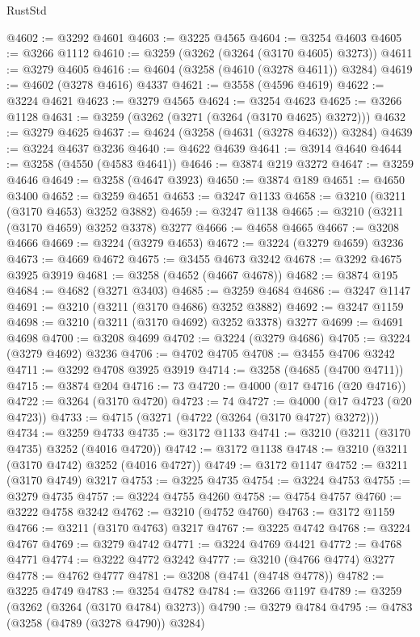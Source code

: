 \begin{lexlean}{RustStd}
\begin{coremodule}
@4602 := @3292 @4601
@4603 := @3225 @4565
@4604 := @3254 @4603
@4605 := @3266 @1112
@4610 := @3259 (@3262 (@3264 (@3170 @4605) @3273))
@4611 := @3279 @4605
@4616 := @4604 (@3258 (@4610 (@3278 @4611)) @3284)
@4619 := @4602 (@3278 @4616) @4337
@4621 := @3558 (@4596 @4619)
@4622 := @3224 @4621
@4623 := @3279 @4565
@4624 := @3254 @4623
@4625 := @3266 @1128
@4631 := @3259 (@3262 (@3271 (@3264 (@3170 @4625) @3272)))
@4632 := @3279 @4625
@4637 := @4624 (@3258 (@4631 (@3278 @4632)) @3284)
@4639 := @3224 @4637 @3236
@4640 := @4622 @4639
@4641 := @3914 @4640
@4644 := @3258 (@4550 (@4583 @4641))
@4646 := @3874 @219 @3272
@4647 := @3259 @4646
@4649 := @3258 (@4647 @3923)
@4650 := @3874 @189
@4651 := @4650 @3400
@4652 := @3259 @4651
@4653 := @3247 @1133
@4658 := @3210 (@3211 (@3170 @4653) @3252 @3882)
@4659 := @3247 @1138
@4665 := @3210 (@3211 (@3170 @4659) @3252 @3378) @3277
@4666 := @4658 @4665
@4667 := @3208 @4666
@4669 := @3224 (@3279 @4653)
@4672 := @3224 (@3279 @4659) @3236
@4673 := @4669 @4672
@4675 := @3455 @4673 @3242
@4678 := @3292 @4675 @3925 @3919
@4681 := @3258 (@4652 (@4667 @4678))
@4682 := @3874 @195
@4684 := @4682 (@3271 @3403)
@4685 := @3259 @4684
@4686 := @3247 @1147
@4691 := @3210 (@3211 (@3170 @4686) @3252 @3882)
@4692 := @3247 @1159
@4698 := @3210 (@3211 (@3170 @4692) @3252 @3378) @3277
@4699 := @4691 @4698
@4700 := @3208 @4699
@4702 := @3224 (@3279 @4686)
@4705 := @3224 (@3279 @4692) @3236
@4706 := @4702 @4705
@4708 := @3455 @4706 @3242
@4711 := @3292 @4708 @3925 @3919
@4714 := @3258 (@4685 (@4700 @4711))
@4715 := @3874 @204
@4716 := 73
@4720 := @4000 (@17 @4716 (@20 @4716))
@4722 := @3264 (@3170 @4720)
@4723 := 74
@4727 := @4000 (@17 @4723 (@20 @4723))
@4733 := @4715 (@3271 (@4722 (@3264 (@3170 @4727) @3272)))
@4734 := @3259 @4733
@4735 := @3172 @1133
@4741 := @3210 (@3211 (@3170 @4735) @3252 (@4016 @4720))
@4742 := @3172 @1138
@4748 := @3210 (@3211 (@3170 @4742) @3252 (@4016 @4727))
@4749 := @3172 @1147
@4752 := @3211 (@3170 @4749) @3217
@4753 := @3225 @4735
@4754 := @3224 @4753
@4755 := @3279 @4735
@4757 := @3224 @4755 @4260
@4758 := @4754 @4757
@4760 := @3222 @4758 @3242
@4762 := @3210 (@4752 @4760)
@4763 := @3172 @1159
@4766 := @3211 (@3170 @4763) @3217
@4767 := @3225 @4742
@4768 := @3224 @4767
@4769 := @3279 @4742
@4771 := @3224 @4769 @4421
@4772 := @4768 @4771
@4774 := @3222 @4772 @3242
@4777 := @3210 (@4766 @4774) @3277
@4778 := @4762 @4777
@4781 := @3208 (@4741 (@4748 @4778))
@4782 := @3225 @4749
@4783 := @3254 @4782
@4784 := @3266 @1197
@4789 := @3259 (@3262 (@3264 (@3170 @4784) @3273))
@4790 := @3279 @4784
@4795 := @4783 (@3258 (@4789 (@3278 @4790)) @3284)

\end{coremodule}
\end{lexlean}
